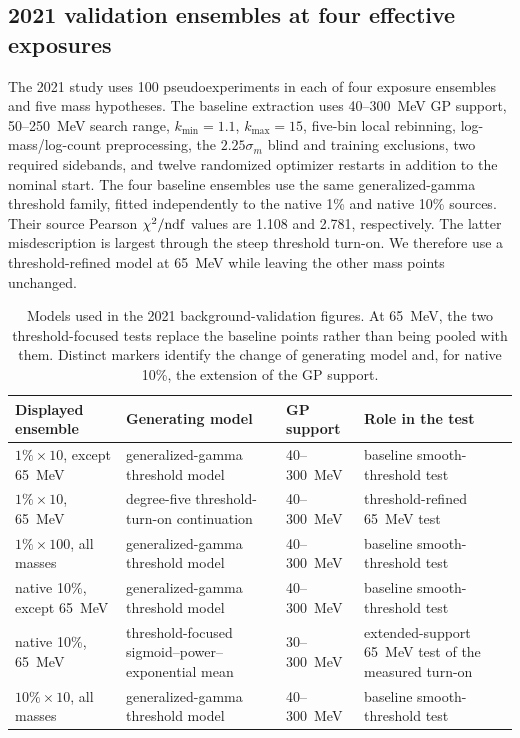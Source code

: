 \subsection{2021 validation ensembles at four effective exposures}
\label{sec:v491-four-lane-ensemble}

The 2021 study uses 100 pseudoexperiments in each of four exposure ensembles and five
mass hypotheses. The baseline extraction uses 40--300~MeV GP
support, 50--250~MeV search range, $k_{\min}=1.1$, $k_{\max}=15$,
five-bin local rebinning, log-mass/log-count preprocessing, the
$2.25\sigma_m$ blind and training exclusions, two required sidebands, and twelve
randomized optimizer restarts in addition to the nominal start. The four baseline
ensembles use the same generalized-gamma threshold family, fitted independently to the
native 1\% and native 10\% sources.  Their source Pearson
$\chi^2/{\rm ndf}$ values are 1.108 and 2.781, respectively.  The latter
misdescription is largest through the steep threshold
turn-on. We therefore use a threshold-refined model at 65~MeV while leaving the other
mass points unchanged.

\begin{table}[htbp]
\centering
\small
\begin{tabularx}{\textwidth}{P{0.17\textwidth}P{0.20\textwidth}P{0.24\textwidth}Y}
\toprule
Displayed ensemble & Generating model & GP support & Role in the test \\
\midrule
$1\%\times10$, except 65~MeV & generalized-gamma threshold model & 40--300~MeV & baseline smooth-threshold test \\
$1\%\times10$, 65~MeV & degree-five threshold-turn-on continuation & 40--300~MeV & threshold-refined 65~MeV test \\
$1\%\times100$, all masses & generalized-gamma threshold model & 40--300~MeV & baseline smooth-threshold test \\
native 10\%, except 65~MeV & generalized-gamma threshold model & 40--300~MeV & baseline smooth-threshold test \\
native 10\%, 65~MeV & threshold-focused sigmoid--power--exponential mean & 30--300~MeV & extended-support 65~MeV test of the measured turn-on \\
$10\%\times10$, all masses & generalized-gamma threshold model & 40--300~MeV & baseline smooth-threshold test \\
\bottomrule
\end{tabularx}
\caption{Models used in the 2021 background-validation figures. At 65~MeV, the two
threshold-focused tests replace the baseline points rather than being pooled with
them. Distinct markers identify the change of generating model and, for native 10\%,
the extension of the GP support.}
\label{tab:v491-composite-scheme-map}
\end{table}


